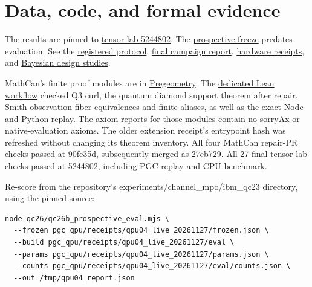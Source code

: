 \documentclass[11pt,a4paper]{article}
\begin{document}
\section*{Data, code, and formal evidence}

The results are pinned to \href{https://github.com/patrickdugan/tensor-lab/commit/5244802c3e3f8317a359096d8ef2f1ba5f1cd7c6}{tensor-lab 5244802}. The \href{https://github.com/patrickdugan/tensor-lab/commit/1f120d1250d49d6c91aa21b12215e6a90ff6564a}{prospective freeze} predates evaluation. See the \href{https://github.com/patrickdugan/tensor-lab/blob/1f120d1250d49d6c91aa21b12215e6a90ff6564a/experiments/channel_mpo/ibm_qc23/qc26/PGC_QPU04_PROTOCOL.md}{registered protocol}, \href{https://github.com/patrickdugan/tensor-lab/blob/5244802c3e3f8317a359096d8ef2f1ba5f1cd7c6/experiments/channel_mpo/ibm_qc23/qc26/PGC_QPU04_CAMPAIGN_REPORT.md}{final campaign report}, \href{https://github.com/patrickdugan/tensor-lab/tree/5244802c3e3f8317a359096d8ef2f1ba5f1cd7c6/experiments/channel_mpo/ibm_qc23/pgc_qpu/receipts/qpu04_live_20261127}{hardware receipts}, and \href{https://github.com/patrickdugan/tensor-lab/tree/5244802c3e3f8317a359096d8ef2f1ba5f1cd7c6/experiments/channel_mpo/ibm_qc23/pgc_qpu/bpd/nonlinear}{Bayesian design studies}.

MathCan's finite proof modules are in \href{https://github.com/patrickdugan/MathCan/tree/27eb7296a8d7670903ab8789921168e9d3ff1661/MathCan/Pregeometry}{Pregeometry}. The \href{https://github.com/patrickdugan/MathCan/actions/runs/46033610752}{dedicated Lean workflow} checked Q3 curl, the quantum diamond support theorem after repair, Smith observation fiber equivalences and finite aliases, as well as the exact Node and Python replay. The axiom reports for those modules contain no sorryAx or native-evaluation axioms. The older extension receipt's entrypoint hash was refreshed without changing its theorem inventory. All four MathCan repair-PR checks passed at 90fc35d, subsequently merged as \href{https://github.com/patrickdugan/MathCan/commit/27eb7296a8d7670903ab8789921168e9d3ff1661}{27eb729}. All 27 final tensor-lab checks passed at 5244802, including \href{https://github.com/patrickdugan/tensor-lab/actions/runs/46032571852}{PGC replay and CPU benchmark}.

Re-score from the repository's experiments/channel\_mpo/ibm\_qc23 directory, using the pinned source:
    
{\small\begin{verbatim}
node qc26/qc26b_prospective_eval.mjs \
  --frozen pgc_qpu/receipts/qpu04_live_20261127/frozen.json \
  --build pgc_qpu/receipts/qpu04_live_20261127/eval \
  --params pgc_qpu/receipts/qpu04_live_20261127/params.json \
  --counts pgc_qpu/receipts/qpu04_live_20261127/eval/counts.json \
  --out /tmp/qpu04_report.json
\end{verbatim}}
\end{document}
